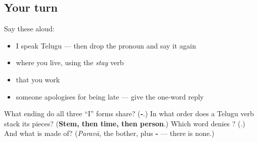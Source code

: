 \subsection*{Your turn}
Say these aloud:

\begin{itemize}
\raggedright
  \item I speak Telugu — then drop the pronoun and say it again
  \item where you live, using the \emph{stay} verb
  \item that you work
  \item someone apologises for being late — give the one-word reply
\end{itemize}

\begin{tcolorbox}[breakable,colback=teal!4,colframe=teal!35!black,title={Before you move on}]
What ending do all three \textquotedblleft{}I\textquotedblright{} forms share? (\textbf{‑}.) In what order does a Telugu verb stack its pieces? (\textbf{Stem, then time, then person}.) Which word denies \textbf{}? (\textbf{}.) And what is \textbf{} made of? (\emph{Paravā}, the bother, plus \textbf{‑} — there is none.)
\end{tcolorbox}
